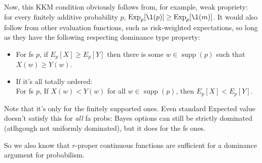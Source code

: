 \documentclass[11pt]{article}
\newtheorem{lemma}[theorem]{Lemma}
\theoremstyle{definition}
\theoremstyle{remark}
\newcommand{\R}{\mathbb R}
\newcommand{\M}{\mathcal M}
\newcommand{\Lf}{\mathfrak L}
\newcommand{\supp}{\operatorname{supp}}
\newcommand{\Exp}{\operatorname{Exp}}
\begin{document}

Now, this KKM condition obviously follows from, for example, weak propriety: for every finitely additive probability $p$, $\Exp_p[\l(p)]\geq\Exp_p[\l(m)]$. It would also follow from other evaluation functions, such as risk-weighted expectations, so long as they have the following respecting dominance type property: 
	\begin{itemize}
	\item For fs $p$, if $E_p[X]\geq E_p[Y]$ then there is some $w\in\supp(p)$ such that $X(w)\geq Y(w)$.
	\item If it's all totally ordered:\\
	For fs $p$, If $X(w)< Y(w)$ for all $w\in\supp(p)$, then $E_p[X]<E_p[Y]$. 
\end{itemize}
Note that it's only for the finitely supported ones. Even standard Expected value doesn't satisfy this for \emph{all} fa probs: Bayes options can still be strictly dominated (atlhgough not uniformly dominated), but it does for the fs ones. 

So we also know that $r$-proper continuous functions are sufficient for a dominance argument for probabilism. 


%
%	
%	
%	
%	
%	
%	
\end{document}
